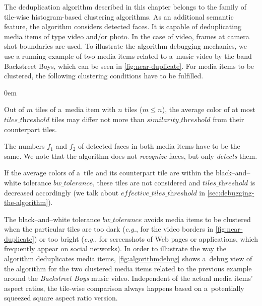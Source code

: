 The deduplication algorithm described in this chapter
belongs to the family of tile-wise histogram-based clustering algorithms.
As an additional semantic feature, the algorithm considers detected faces.
It is capable of deduplicating media items of type video and/or photo.
In the case of video, frames at camera shot boundaries are used.
To illustrate the algorithm debugging mechanics,
we use a running example of two media items related to a~music video by the 
band Backstreet Boys, which can be seen in \autoref{fig:near-duplicate}.
For media items to be clustered,
the following clustering conditions have to be fulfilled.

\begin{description}
  \itemsep0em
  \item[Cond.~1] Out of $m$ tiles of a~media item with $n$ tiles ($m \leq n$),
    the average color of at most $\textit{tiles\_threshold}$ tiles
    may differ not more than $\textit{similarity\_threshold}$
    from their counterpart tiles.
  \item[Cond.~2] The numbers $f_1$ and $f_2$ of detected faces
    in both media items have to be the same.
    We note that the algorithm does not \emph{recognize} faces,
    but only \emph{detects} them.
  \item[Cond.~3] If the average colors of a~tile and its counterpart tile
    are within the black--and--white tolerance $\textit{bw\_tolerance}$,
    these tiles are not considered and $\textit{tiles\_threshold}$
    is decreased accordingly (we talk about $\textit{effective\_tiles\_threshold}$
    in \autoref{sec:debugging-the-algorithm}).
\end{description}

The black--and--white tolerance $\textit{bw\_tolerance}$ avoids media items
to be clustered when the particular tiles are too dark (\emph{e.g.},
for the video borders in \autoref{fig:near-duplicate}) or too bright (\emph{e.g.},
for screenshots of Web pages or applications, which frequently appear on social networks).
In order to illustrate the way the algorithm deduplicates media items,
\autoref{fig:algorithmdebug} shows a~debug view of the algorithm
for the two clustered media items related to the previous example
around the \emph{Backstreet Boys} music video.
Independent of the actual media items' aspect ratios,
the tile-wise comparison always happens based on
a~potentially squeezed square aspect ratio version.

